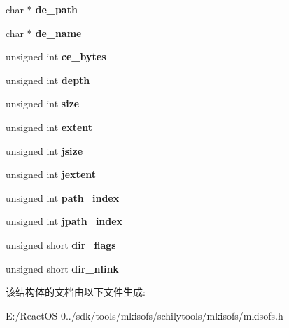 \begin{DoxyCompactItemize}
char $\ast$ {\bfseries de\+\_\+path}
\item 
\mbox{\label{structdirectory_a18012061bc81e0cd482beb31432bb333}} 
char $\ast$ {\bfseries de\+\_\+name}
\item 
\mbox{\label{structdirectory_a2f8fc46cb27c6ddbc967bde21b9627b7}} 
unsigned int {\bfseries ce\+\_\+bytes}
\item 
\mbox{\label{structdirectory_a93e8fa3721fc87d4c0f7ef514b9d41a0}} 
unsigned int {\bfseries depth}
\item 
\mbox{\label{structdirectory_a5a18b36d7e47c539145e0f3f3695963c}} 
unsigned int {\bfseries size}
\item 
\mbox{\label{structdirectory_a3e99a6016c9570a7993369e589089ec4}} 
unsigned int {\bfseries extent}
\item 
\mbox{\label{structdirectory_a4efd7cac450ba90ed1e37936aed8399f}} 
unsigned int {\bfseries jsize}
\item 
\mbox{\label{structdirectory_a956dd1c86ca9dfe6c495f3a4e91d5b82}} 
unsigned int {\bfseries jextent}
\item 
\mbox{\label{structdirectory_ae94bc0e84ab21899426889c612b721c0}} 
unsigned int {\bfseries path\+\_\+index}
\item 
\mbox{\label{structdirectory_a1682b533db4d8ff865a497dac99f6ff6}} 
unsigned int {\bfseries jpath\+\_\+index}
\item 
\mbox{\label{structdirectory_a237ee30f77b59100e0c789c5cbd5f3c6}} 
unsigned short {\bfseries dir\+\_\+flags}
\item 
\mbox{\label{structdirectory_af982af373be7abe69e952fd215a8bfb2}} 
unsigned short {\bfseries dir\+\_\+nlink}
\end{DoxyCompactItemize}


该结构体的文档由以下文件生成\+:\begin{DoxyCompactItemize}
\item 
E\+:/\+React\+O\+S-\/0../sdk/tools/mkisofs/schilytools/mkisofs/mkisofs.\+h\end{DoxyCompactItemize}
